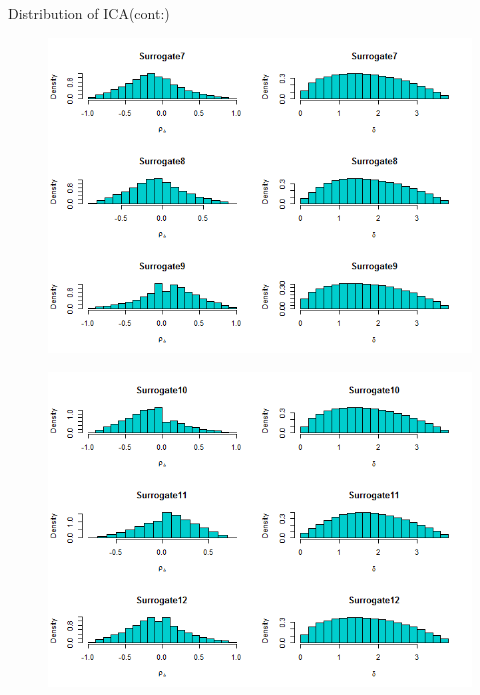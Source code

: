 \documentclass[a4paper,9pt]{beamer}\usepackage[]{graphicx}\usepackage[]{color}
\begin{document}
\begin{frame}{Distribution of ICA(cont:)}
\begin{minipage}{0.3\textwidth}
\begin{figure}[H]
\includegraphics[scale=0.32]{icaplots3.png}
\end{figure}
\end{minipage}
\hfill
\begin{minipage}{0.40\textwidth}
\begin{figure}[H]
\includegraphics[scale=0.32]{icaplots4.png}
\end{figure}

\end{minipage}

\end{frame}
\end{document}
